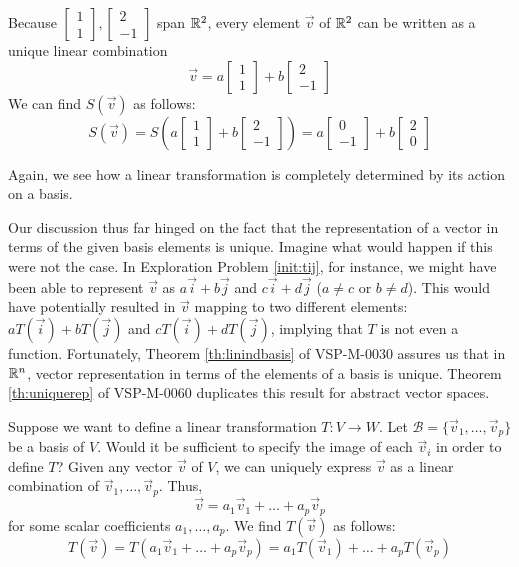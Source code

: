 \documentclass{ximera}
\begin{document}
\begin{exploration}
Because $\begin{bmatrix}1\\1\end{bmatrix},\begin{bmatrix}2\\-1\end{bmatrix}$ span $\mathbb{R}^2$, every element $\vec{v}$ of $\mathbb{R}^2$ can be written as a unique linear combination $$\vec{v}=a\begin{bmatrix}1\\1\end{bmatrix}+b\begin{bmatrix}2\\-1\end{bmatrix}$$
We can find $S(\vec{v})$ as follows:
$$S(\vec{v})=S\left(a\begin{bmatrix}1\\1\end{bmatrix}+b\begin{bmatrix}2\\-1\end{bmatrix}\right)=a\begin{bmatrix}0\\-1\end{bmatrix}+b\begin{bmatrix}2\\0\end{bmatrix}$$

Again, we see how a linear transformation is completely determined by its action on a basis.

\end{exploration}



Our discussion thus far hinged on the fact that the representation of a vector in terms of the given basis elements is unique.  Imagine what would happen if this were not the case.  In Exploration Problem \ref{init:tij}, for instance, we might have been able to represent $\vec{v}$ as $a\vec{i}+b\vec{j}$ and $c\vec{i}+d\vec{j}$ ($a\neq c$ or $b\neq d$).  This would have potentially resulted in $\vec{v}$ mapping to two different elements: $aT(\vec{i})+bT(\vec{j})$ and $cT(\vec{i})+dT(\vec{j})$, implying that $T$ is not even a function.  Fortunately, Theorem \ref{th:linindbasis} of VSP-M-0030 assures us that in $\mathbb{R}^n$, vector representation in terms of the elements of a basis is unique.  
Theorem \ref{th:uniquerep} of VSP-M-0060 duplicates this result for abstract vector spaces.

Suppose we want to define a linear transformation $T:V\rightarrow W$.  Let $\mathcal{B}=\{\vec{v}_1,\ldots,\vec{v}_p\}$ be a basis of $V$.  Would it be sufficient to specify the image of each $\vec{v}_i$ in order to define $T$?
Given any vector $\vec{v}$ of $V$, we can uniquely express $\vec{v}$ as a linear combination of $\vec{v}_1,\ldots,\vec{v}_p$.  Thus,
$$\vec{v}=a_1\vec{v}_1+\ldots+a_p\vec{v}_p$$ for some scalar coefficients $a_1,\ldots,a_p$.
We find $T(\vec{v})$ as follows:
$$T(\vec{v})=T(a_1\vec{v}_1+\ldots+a_p\vec{v}_p)=a_1T(\vec{v}_1)+\ldots+a_pT(\vec{v}_p)$$
\end{document}
